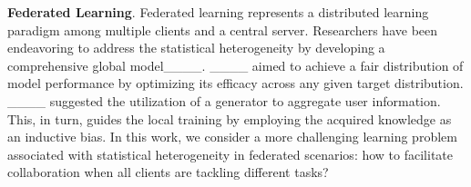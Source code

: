 \textbf{Federated Learning}. 
Federated learning represents a distributed learning paradigm among multiple clients and a central server.
Researchers have been endeavoring to address the  statistical heterogeneity by developing a comprehensive global model____.
____ aimed to achieve a fair distribution of model performance by optimizing its efficacy across any given target distribution.
____ suggested the utilization of a generator to aggregate user information. This, in turn, guides the local training by employing the acquired knowledge as an inductive bias.
In this work, we consider a more challenging learning problem associated with statistical heterogeneity in federated scenarios: how to facilitate collaboration when all clients are tackling different tasks?


